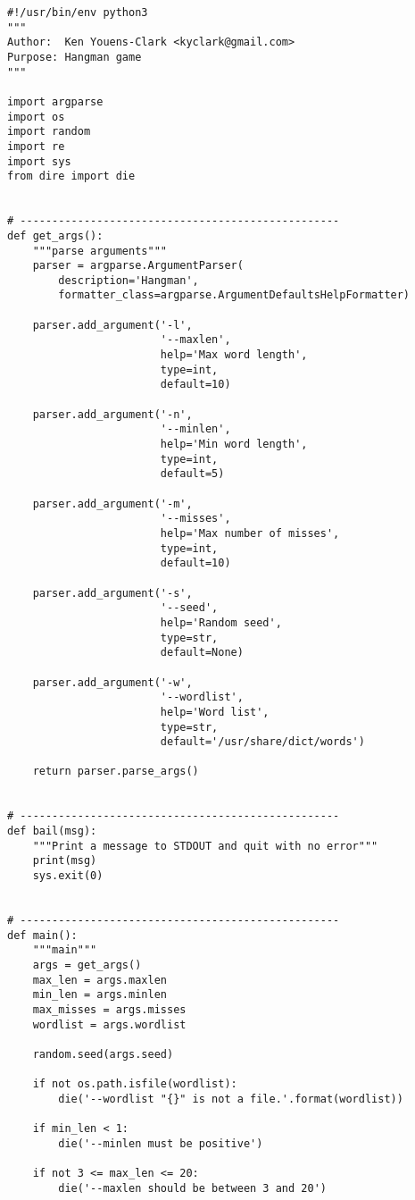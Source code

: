 \documentclass[]{article}
\begin{document}
\begin{verbatim}
#!/usr/bin/env python3
"""
Author:  Ken Youens-Clark <kyclark@gmail.com>
Purpose: Hangman game
"""

import argparse
import os
import random
import re
import sys
from dire import die


# --------------------------------------------------
def get_args():
    """parse arguments"""
    parser = argparse.ArgumentParser(
        description='Hangman',
        formatter_class=argparse.ArgumentDefaultsHelpFormatter)

    parser.add_argument('-l',
                        '--maxlen',
                        help='Max word length',
                        type=int,
                        default=10)

    parser.add_argument('-n',
                        '--minlen',
                        help='Min word length',
                        type=int,
                        default=5)

    parser.add_argument('-m',
                        '--misses',
                        help='Max number of misses',
                        type=int,
                        default=10)

    parser.add_argument('-s',
                        '--seed',
                        help='Random seed',
                        type=str,
                        default=None)

    parser.add_argument('-w',
                        '--wordlist',
                        help='Word list',
                        type=str,
                        default='/usr/share/dict/words')

    return parser.parse_args()


# --------------------------------------------------
def bail(msg):
    """Print a message to STDOUT and quit with no error"""
    print(msg)
    sys.exit(0)


# --------------------------------------------------
def main():
    """main"""
    args = get_args()
    max_len = args.maxlen
    min_len = args.minlen
    max_misses = args.misses
    wordlist = args.wordlist

    random.seed(args.seed)

    if not os.path.isfile(wordlist):
        die('--wordlist "{}" is not a file.'.format(wordlist))

    if min_len < 1:
        die('--minlen must be positive')

    if not 3 <= max_len <= 20:
        die('--maxlen should be between 3 and 20')


\end{verbatim}
\end{document}
